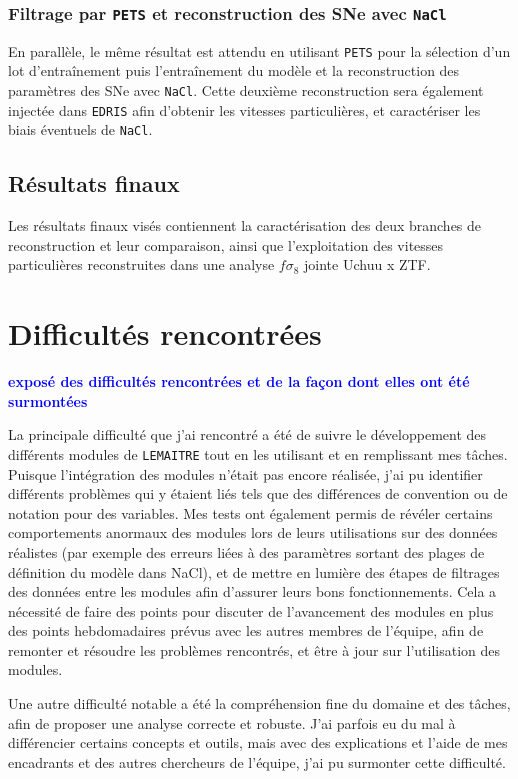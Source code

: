 \documentclass{book}
\newcommand{\consignes}[1]{{\textcolor{blue}{\bf \large #1}}}
\def\lemaitre{\texttt{LEMAITRE}\xspace}
\def\pets{\texttt{PETS}\xspace}
\def\nacl{\texttt{NaCl}\xspace}
\def\edris{\texttt{EDRIS}\xspace}
\begin{document}
\subsubsection{Filtrage par \pets et reconstruction des SNe avec \nacl}

En parallèle, le même résultat est attendu en utilisant \pets pour la sélection d'un lot d'entraînement puis l'entraînement du modèle et la reconstruction des paramètres des SNe avec \nacl. Cette deuxième reconstruction sera également injectée dans \edris afin d'obtenir les vitesses particulières, et caractériser les biais éventuels de \nacl.

\subsection{Résultats finaux}

Les résultats finaux visés contiennent la caractérisation des deux branches de reconstruction et leur comparaison, ainsi que l'exploitation des vitesses particulières reconstruites dans une analyse $f\sigma_8$ jointe Uchuu x ZTF.

\section{Difficultés rencontrées}
\consignes{exposé des difficultés rencontrées et de la façon dont elles ont été surmontées}

La principale difficulté que j'ai rencontré a été de suivre le développement des différents modules de \lemaitre tout en les utilisant et en remplissant mes tâches. Puisque l'intégration des modules n'était pas encore réalisée, j'ai pu identifier différents problèmes qui y étaient liés tels que des différences de convention ou de notation pour des variables. Mes tests ont également permis de révéler certains comportements anormaux des modules lors de leurs utilisations sur des données réalistes (par exemple des erreurs liées à des paramètres sortant des plages de définition du modèle dans NaCl), et de mettre en lumière des étapes de filtrages des données entre les modules afin d'assurer leurs bons fonctionnements. Cela a nécessité de faire des points pour discuter de l'avancement des modules en plus des points hebdomadaires prévus avec les autres membres de l'équipe, afin de remonter et résoudre les problèmes rencontrés, et être à jour sur l'utilisation des modules.

Une autre difficulté notable a été la compréhension fine du domaine et des tâches, afin de proposer une analyse correcte et robuste. J'ai parfois eu du mal à différencier certains concepts et outils, mais avec des explications et l'aide de mes encadrants et des autres chercheurs de l'équipe, j'ai pu surmonter cette difficulté.
\end{document}

